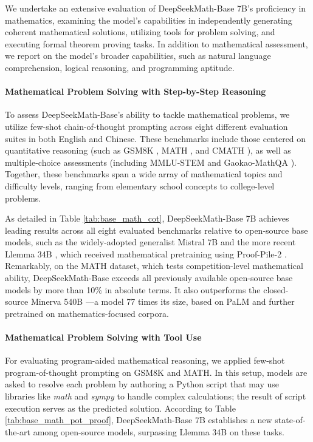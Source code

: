 \begin{itemize}[topsep=0pt]
We undertake an extensive evaluation of DeepSeekMath-Base 7B's proficiency in mathematics, examining the model's capabilities in independently generating coherent mathematical solutions, utilizing tools for problem solving, and executing formal theorem proving tasks. In addition to mathematical assessment, we report on the model’s broader capabilities, such as natural language comprehension, logical reasoning, and programming aptitude.

\paragraph{Mathematical Problem Solving with Step-by-Step Reasoning}

To assess DeepSeekMath-Base's ability to tackle mathematical problems, we utilize few-shot chain-of-thought prompting \citep{cot} across eight different evaluation suites in both English and Chinese. These benchmarks include those centered on quantitative reasoning (such as GSM8K \citep{gsm8k}, MATH \citep{MATH}, and CMATH \citep{wei2023cmath}), as well as multiple-choice assessments (including MMLU-STEM \citep{mmlu} and Gaokao-MathQA \citep{agieval}). Together, these benchmarks span a wide array of mathematical topics and difficulty levels, ranging from elementary school concepts to college-level problems.

As detailed in Table \ref{tab:base_math_cot}, DeepSeekMath-Base 7B achieves leading results across all eight evaluated benchmarks relative to open-source base models, such as the widely-adopted generalist Mistral 7B \citep{mistral} and the more recent Llemma 34B \citep{llemma}, which received mathematical pretraining using Proof-Pile-2 \citep{llemma}. Remarkably, on the MATH dataset, which tests competition-level mathematical ability, DeepSeekMath-Base exceeds all previously available open-source base models by more than 10\% in absolute terms. It also outperforms the closed-source Minerva 540B \citep{minerva}—a model 77 times its size, based on PaLM \citep{palm} and further pretrained on mathematics-focused corpora.

\paragraph{Mathematical Problem Solving with Tool Use} For evaluating program-aided mathematical reasoning, we applied few-shot program-of-thought prompting \citep{pot,pal} on GSM8K and MATH. In this setup, models are asked to resolve each problem by authoring a Python script that may use libraries like \textit{math} and \textit{sympy} to handle complex calculations; the result of script execution serves as the predicted solution. According to Table \ref{tab:base_math_pot_proof}, DeepSeekMath-Base 7B establishes a new state-of-the-art among open-source models, surpassing Llemma 34B on these tasks.


\end{itemize}
